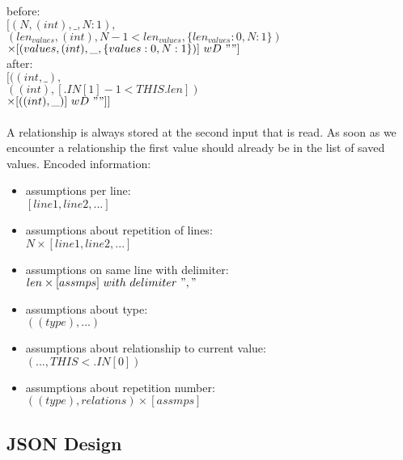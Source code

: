 \documentclass[11pt]{article}
\begin{document}
before:\\
$[(N, (int), \_, {N: 1}),$\\
$(len_{values}, (int), N-1 < len_{values}, \{len_{values}: 0, N: 1\})$\\
$\times [(values, (int), \_, \{values: 0, N: 1\})]\ wD\ " "]$\\
after:\\
$[((int, \_),$\\
$((int), [.IN[1]-1 < THIS.len])$\\
$\times [((int), \_)]\ wD\ " "]]$\\
\\
A relationship is always stored at the second input that is read. As soon as we encounter a relationship the first value should already be in the list of saved values.
Encoded information:\\
\begin{itemize}
  \item assumptions per line:\\
  $[line1, line2, ...]$
  \item assumptions about repetition of lines:\\
  $N \times [line1, line2, ...]$
  \item assumptions on same line with delimiter:\\
  $len \times [assmps]\ with\ delimiter\ ","$
  \item assumptions about type:\\
  $((type), ...)$
  \item assumptions about relationship to current value:\\
  $(..., THIS < .IN[0])$
  \item assumptions about repetition number:\\
  $((type), relations) \times [assmps]$
\end{itemize}

\subsection{JSON Design}
\end{document}

